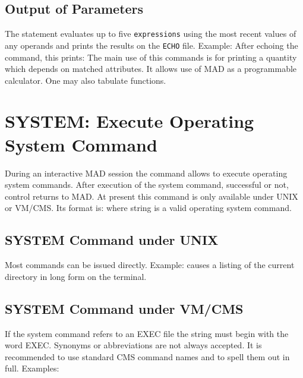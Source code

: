 \subsection{Output of Parameters}
\label{S-VALUE}
The  statement
evaluates up to five {\tt expressions} using the most recent values of
any operands and prints the results on the {\tt ECHO} file.
Example:
After echoing the command, this prints:
The main use of this commands is for printing a quantity
which depends on matched attributes.
It allows use of MAD as a programmable calculator.
One may also tabulate functions.
 
\section{SYSTEM: Execute Operating System Command}
\label{S-SYSTEM}
During an interactive MAD session the command 
allows to execute operating system commands.
After execution of the system command, successful or not,
control returns to MAD.
At present this command is only available under UNIX or VM/CMS.
Its format is:
where string is a valid operating system command.
 
\subsection{SYSTEM Command under UNIX}
Most  commands can be issued directly. Example:
causes a listing of the current directory in long form on the terminal.
 
\subsection{SYSTEM Command under VM/CMS}
If the  system command refers to an EXEC file the string
must begin with the word EXEC.
Synonyms or abbreviations are not always accepted.
It is recommended to use standard CMS command names
and to spell them out in full.
Examples:

